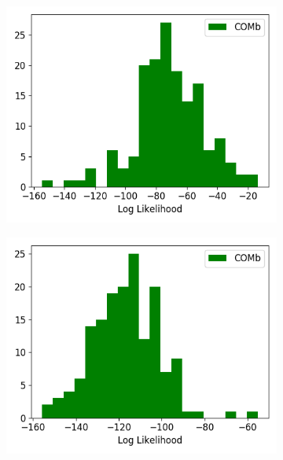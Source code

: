 \begin{figure}[p]
\begin{subfigure}[h]{0.5\linewidth}
        \label{fig:v1_betabinom_1ms_stimulated_log_likelihood_hist}
      \end{subfigure}
      \begin{subfigure}[h]{0.5\linewidth}
        \includegraphics[width=\linewidth]{figures/conway_maxwell/v1_comb_1ms_unstimulated_log_likelihood_hist.png}
        \label{fig:v1_comb_1ms_unstimulated_log_likelihood_hist}
      \end{subfigure}
      \begin{subfigure}[h]{0.5\linewidth}
        \includegraphics[width=\linewidth]{figures/conway_maxwell/v1_comb_1ms_stimulated_log_likelihood_hist.png}

\end{subfigure}
\end{figure}

